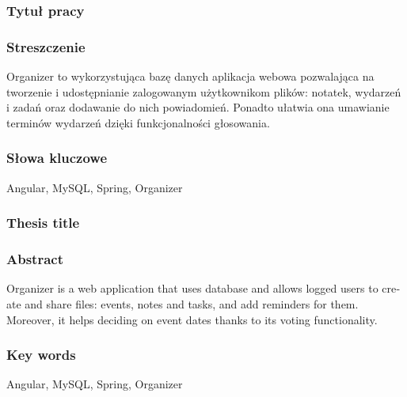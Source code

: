 \documentclass[a4paper,twoside,12pt]{book}
\begin{document}


\cleardoublepage

\rmfamily\normalfont
\pagestyle{empty}



\subsubsection*{Tytuł pracy} 
\Title

\subsubsection*{Streszczenie}  
Organizer to wykorzystująca bazę danych aplikacja webowa pozwalająca na tworzenie i udostępnianie zalogowanym użytkownikom plików: notatek, wydarzeń i zadań oraz dodawanie do nich powiadomień. Ponadto ułatwia ona umawianie terminów wydarzeń dzięki funkcjonalności głosowania.

\subsubsection*{Słowa kluczowe} 
Angular, MySQL, Spring, Organizer

\subsubsection*{Thesis title} 
\begin{otherlanguage}{british}
\TitleAlt
\end{otherlanguage}

\subsubsection*{Abstract} 
\begin{otherlanguage}{british}
Organizer is a web application that uses database and allows logged users to create and share files: events, notes and tasks, and add reminders for them. Moreover, it helps deciding on event dates thanks to its voting functionality.
\end{otherlanguage}
\subsubsection*{Key words}  
\begin{otherlanguage}{british}
Angular, MySQL, Spring, Organizer
\end{otherlanguage}
\end{document}
